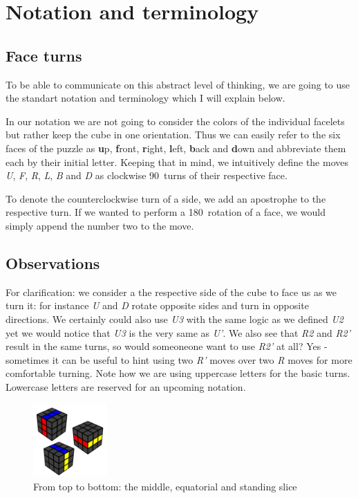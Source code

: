 \documentclass{scrreprt}
\begin{document}
\section{Notation and terminology}
\subsection{Face turns}
To be able to communicate on this abstract level of thinking, we are going to use the standart notation and terminology which I will explain below.\par
In our notation we are not going to consider the colors of the individual facelets but rather keep the cube in one orientation. Thus we can easily refer to the six faces of the puzzle as \textbf{u}p, \textbf{f}ront, \textbf{r}ight, \textbf{l}eft, \textbf{b}ack and \textbf{d}own and abbreviate them each by their initial letter. Keeping that in mind, we intuitively define the moves \emph{U}, \emph{F}, \emph{R}, \emph{L}, \emph{B} and \emph{D} as clockwise 90\textdegree\ turns of their respective face.\par
To denote the counterclockwise turn of a side, we add an apostrophe to the respective turn. If we wanted to perform a 180\textdegree\ rotation of a face, we would simply append the number two to the move.


\subsection{Observations}
For clarification: we consider a the respective side of the cube to face us as we turn it: for instance \emph{U} and \emph{D} rotate opposite sides and turn in opposite directions. We certainly could also use \emph{U3} with the same logic as we defined \emph{U2} yet we would notice that \emph{U3} is the very same as \emph{U'}. We also see that \emph{R2} and \emph{R2'} result in the same turns, so would someoneone want to use \emph{R2'} at all? Yes - sometimes it can be useful to hint using two \emph{R'} moves over two \emph{R} moves for more comfortable turning. Note how we are using uppercase letters for the basic turns. Lowercase letters are reserved for an upcoming notation.

\begin{figure}
\centering
\includegraphics[width=0.25\textwidth]{slices.png}
\caption*{From top to bottom: the middle, equatorial and standing slice}
\end{figure}
\end{document}
